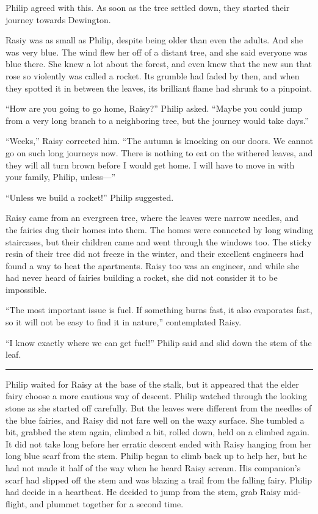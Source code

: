 \documentclass[10pt, draft]{memoir}
\renewcommand{\pfbreakdisplay}{\bigskip \ding{166} \bigskip}
\newcommand{\secbreak}{\fancybreak{\pfbreakdisplay}}
\begin{document}
Philip agreed with this. As soon as the tree settled down, they started their
journey towards Dewington.

Rasiy was as small as Philip, despite being older than even the adults. And she
was very blue. The wind flew her off of a distant tree, and she said everyone
was blue there. She knew a lot about the forest, and even knew that the new sun
that rose so violently was called a rocket. Its grumble had faded by then, and
when they spotted it in between the leaves, its brilliant flame had shrunk to a
pinpoint.

``How are you going to go home, Raisy?'' Philip asked. ``Maybe you could jump
from a very long branch to a neighboring tree, but the journey would take
days.''

``Weeks,'' Raisy corrected him. ``The autumn is knocking on our doors. We
cannot go on such long journeys now. There is nothing to eat on the withered
leaves, and they will all turn brown before I would get home. I will have to
move in with your family, Philip, unless---''

``Unless we build a rocket!'' Philip suggested.

Raisy came from an evergreen tree, where the leaves were narrow needles, and
the fairies dug their homes into them. The homes were connected by long winding
staircases, but their children came and went through the windows too. The
sticky resin of their tree did not freeze in the winter, and their excellent
engineers had found a way to heat the apartments. Raisy too was an engineer,
and while she had never heard of fairies building a rocket, she did not
consider it to be impossible.

``The most important issue is fuel. If something burns fast, it also evaporates
fast, so it will not be easy to find it in nature,'' contemplated Raisy.

``I know exactly where we can get fuel!'' Philip said and slid down the stem of
the leaf.

\secbreak

Philip waited for Raisy at the base of the stalk, but it appeared that the
elder fairy choose a more cautious way of descent. Philip watched through the
looking stone as she started off carefully. But the leaves were different from
the needles of the blue fairies, and Raisy did not fare well on the waxy
surface. She tumbled a bit, grabbed the stem again, climbed a bit, rolled down,
held on a climbed again. It did not take long before her erratic descent ended
with Raisy hanging from her long blue scarf from the stem. Philip began to
climb back up to help her, but he had not made it half of the way when he heard
Raisy scream. His companion's scarf had slipped off the stem and was blazing a
trail from the falling fairy. Philip had decide in a heartbeat. He decided to
jump from the stem, grab Raisy mid-flight, and plummet together for a second
time.
\end{document}
